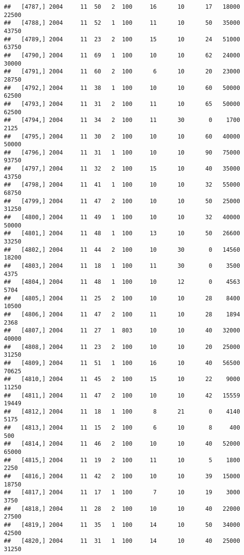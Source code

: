 \documentclass{article}\usepackage[]{graphicx}\usepackage[]{color}
\makeatletter
\newenvironment{kframe}{%
 \def\at@end@of@kframe{}%
 \ifinner\ifhmode%
  \def\at@end@of@kframe{\end{minipage}}%
  \begin{minipage}{\columnwidth}%
 \fi\fi%
 \def\FrameCommand##1{\hskip\@totalleftmargin \hskip-\fboxsep
 \colorbox{shadecolor}{##1}\hskip-\fboxsep
     \hskip-\linewidth \hskip-\@totalleftmargin \hskip\columnwidth}%
 \MakeFramed {\advance\hsize-\width
   \@totalleftmargin\z@ \linewidth\hsize
   \@setminipage}}%
 {\par\unskip\endMakeFramed%
 \at@end@of@kframe}
\newenvironment{knitrout}{}{} %
\makeatother
\begin{document}
\begin{knitrout}
\begin{kframe}
\begin{verbatim}
##   [4787,] 2004     11  50   2  100     16      10      17   18000   22500
##   [4788,] 2004     11  52   1  100     11      10      50   35000   43750
##   [4789,] 2004     11  23   2  100     15      10      24   51000   63750
##   [4790,] 2004     11  69   1  100     10      10      62   24000   30000
##   [4791,] 2004     11  60   2  100      6      10      20   23000   28750
##   [4792,] 2004     11  38   1  100     10      10      60   50000   62500
##   [4793,] 2004     11  31   2  100     11      10      65   50000   62500
##   [4794,] 2004     11  34   2  100     11      30       0    1700    2125
##   [4795,] 2004     11  30   2  100     10      10      60   40000   50000
##   [4796,] 2004     11  31   1  100     10      10      90   75000   93750
##   [4797,] 2004     11  32   2  100     15      10      40   35000   43750
##   [4798,] 2004     11  41   1  100     10      10      32   55000   68750
##   [4799,] 2004     11  47   2  100     10      10      50   25000   31250
##   [4800,] 2004     11  49   1  100     10      10      32   40000   50000
##   [4801,] 2004     11  48   1  100     13      10      50   26600   33250
##   [4802,] 2004     11  44   2  100     10      30       0   14560   18200
##   [4803,] 2004     11  18   1  100     11      30       0    3500    4375
##   [4804,] 2004     11  48   1  100     10      12       0    4563    5704
##   [4805,] 2004     11  25   2  100     10      10      28    8400   10500
##   [4806,] 2004     11  47   2  100     11      10      28    1894    2368
##   [4807,] 2004     11  27   1  803     10      10      40   32000   40000
##   [4808,] 2004     11  23   2  100     10      10      20   25000   31250
##   [4809,] 2004     11  51   1  100     16      10      40   56500   70625
##   [4810,] 2004     11  45   2  100     15      10      22    9000   11250
##   [4811,] 2004     11  47   2  100     10      10      42   15559   19449
##   [4812,] 2004     11  18   1  100      8      21       0    4140    5175
##   [4813,] 2004     11  15   2  100      6      10       8     400     500
##   [4814,] 2004     11  46   2  100     10      10      40   52000   65000
##   [4815,] 2004     11  19   2  100     11      10       5    1800    2250
##   [4816,] 2004     11  42   2  100     10      10      39   15000   18750
##   [4817,] 2004     11  17   1  100      7      10      19    3000    3750
##   [4818,] 2004     11  28   2  100     10      10      40   22000   27500
##   [4819,] 2004     11  35   1  100     14      10      50   34000   42500
##   [4820,] 2004     11  31   1  100     14      10      40   25000   31250

\end{verbatim}
\end{kframe}
\end{knitrout}
\end{document}
